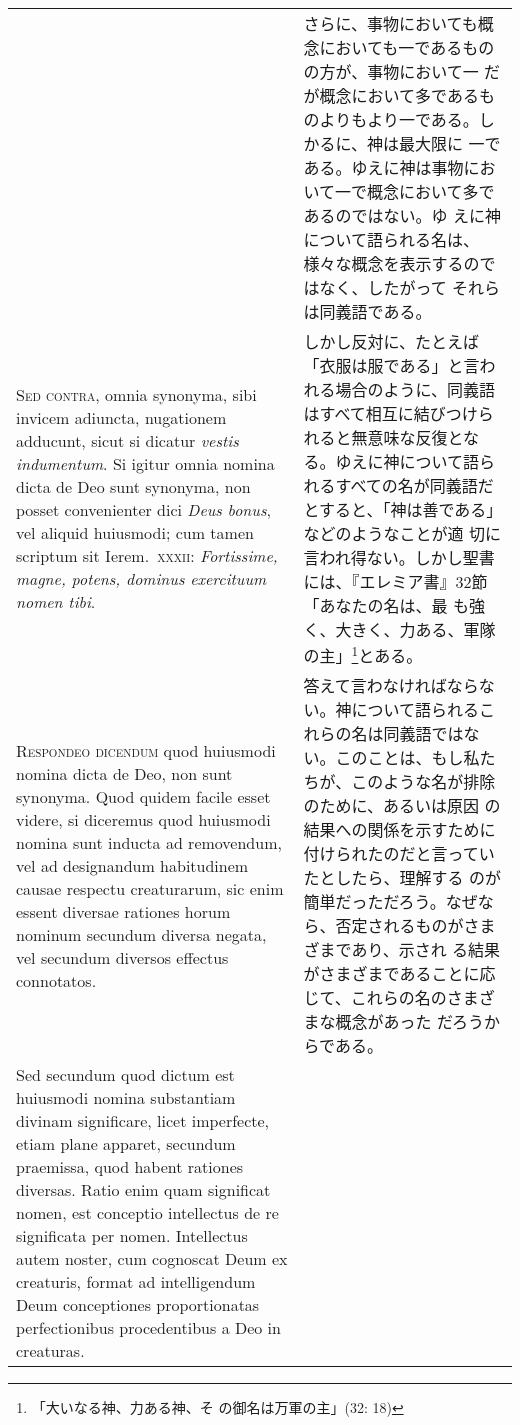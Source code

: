 \documentclass[paper=a4paper,fontsize=10pt,jafontsize=9pt,titlepage]{jlreq}
\begin{document}
\begin{longtable}{p{21em}p{21em}}
&

さらに、事物においても概念においても一であるものの方が、事物において一
だが概念において多であるものよりもより一である。しかるに、神は最大限に
一である。ゆえに神は事物において一で概念において多であるのではない。ゆ
えに神について語られる名は、様々な概念を表示するのではなく、したがって
それらは同義語である。

\\

{\scshape Sed contra}, omnia synonyma, sibi invicem adiuncta, nugationem
adducunt, sicut si dicatur {\itshape vestis indumentum}. Si igitur omnia
nomina dicta de Deo sunt synonyma, non posset convenienter dici {\itshape
Deus bonus}, vel aliquid huiusmodi; cum tamen scriptum sit Ierem.\
{\scshape xxxii}: {\itshape Fortissime, magne, potens, dominus exercituum nomen
tibi}.

&

しかし反対に、たとえば「衣服は服である」と言われる場合のように、同義語
はすべて相互に結びつけられると無意味な反復となる。ゆえに神について語ら
れるすべての名が同義語だとすると、「神は善である」などのようなことが適
切に言われ得ない。しかし聖書には、『エレミア書』32節「あなたの名は、最
も強く、大きく、力ある、軍隊の主」\footnote{「大いなる神、力ある神、そ
の御名は万軍の主」(32: 18)}とある。

\\

{\scshape Respondeo dicendum} quod huiusmodi nomina dicta de Deo, non sunt
synonyma. Quod quidem facile esset videre, si diceremus quod huiusmodi
nomina sunt inducta ad removendum, vel ad designandum habitudinem
causae respectu creaturarum, sic enim essent diversae rationes horum
nominum secundum diversa negata, vel secundum diversos effectus
connotatos.

&

答えて言わなければならない。神について語られるこれらの名は同義語ではな
い。このことは、もし私たちが、このような名が排除のために、あるいは原因
の結果への関係を示すために付けられたのだと言っていたとしたら、理解する
のが簡単だっただろう。なぜなら、否定されるものがさまざまであり、示され
る結果がさまざまであることに応じて、これらの名のさまざまな概念があった
だろうからである。

\\

Sed secundum quod dictum est huiusmodi nomina substantiam divinam
significare, licet imperfecte, etiam plane apparet, secundum
praemissa, quod habent rationes diversas. Ratio enim quam significat
nomen, est conceptio intellectus de re significata per
nomen. Intellectus autem noster, cum cognoscat Deum ex creaturis,
format ad intelligendum Deum conceptiones proportionatas
perfectionibus procedentibus a Deo in creaturas.


\end{longtable}
\end{document}
